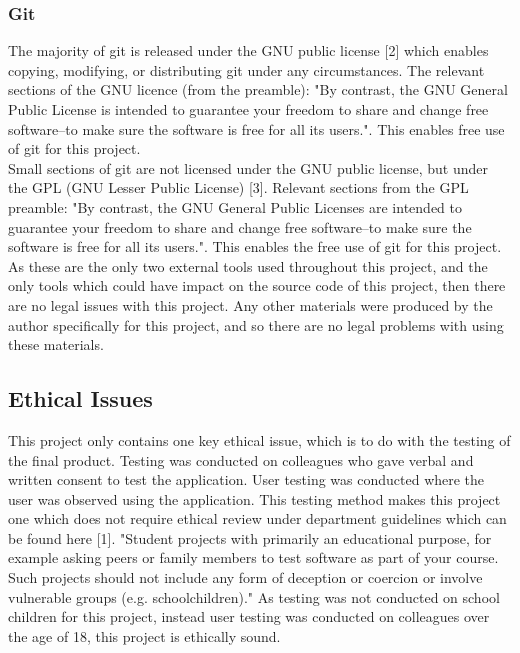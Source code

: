 \documentclass{article}
\begin{document}

\subsubsection{Git}

The majority of git is released under the GNU public license [2] which enables copying, modifying, or distributing git under any circumstances. The relevant sections of the GNU licence (from the preamble): "By contrast, the GNU General Public License is intended to guarantee your freedom to share and change free software--to make sure the software is free for all its users.". This enables free use of git for this project. \\

Small sections of git are not licensed under the GNU public license, but under the GPL (GNU Lesser Public License) [3]. Relevant sections from the GPL preamble: "By contrast, the GNU General Public Licenses are intended to guarantee your freedom to share and change free software--to make sure the software is free for all its users.". This enables the free use of git for this project. \\

As these are the only two external tools used throughout this project, and the only tools which could have impact on the source code of this project, then there are no legal issues with this project. Any other materials were produced by the author specifically for this project, and so there are no legal problems with using these materials. \\

\subsection{Ethical Issues}

This project only contains one key ethical issue, which is to do with the testing of the final product. Testing was conducted on colleagues who gave verbal and written consent to test the application. User testing was conducted where the user was observed using the application. This testing method makes this project one which does not require ethical review under department guidelines which can be found here [1]. "Student projects with primarily an educational purpose, for example asking peers or family members to test software as part of your course. Such projects should not include any form of deception or coercion or involve vulnerable groups (e.g. schoolchildren)." As testing was not conducted on school children for this project, instead user testing was conducted on colleagues over the age of 18, this project is ethically sound. 
\end{document}
